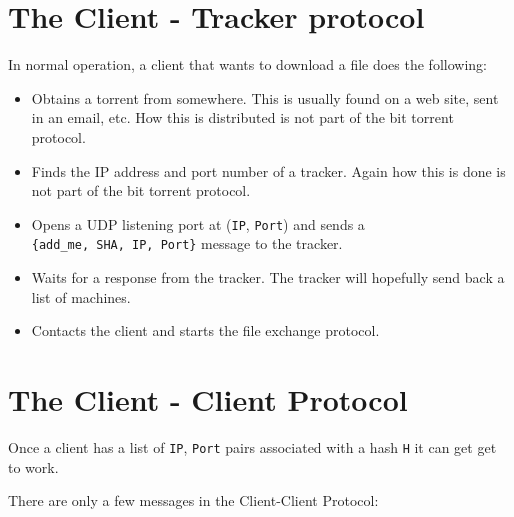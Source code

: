 \documentclass[10pt]{article}
\begin{document}
\section{The Client - Tracker protocol}

In normal operation, a client that wants to download a file does the
following:

\begin{itemize}
\item Obtains a torrent from somewhere. This is usually
  found on a web site, sent in an email, etc. How this 
is distributed is not part of the bit torrent protocol.

\item Finds the IP address and port number of a tracker.
  Again how this is done is not part of the bit torrent protocol.

\item Opens a UDP listening port at (\verb+IP+, \verb+Port+) and sends a\\
  \verb+{add_me, SHA, IP, Port}+ message to the tracker.

\item Waits for a response from the tracker. The tracker will hopefully
send back a list of machines.

\item Contacts the client and starts the file exchange protocol.
\end{itemize}

\section{The Client - Client Protocol}

Once a client has a list of \verb+IP+, \verb+Port+ pairs associated with a
hash \verb+H+ it can get get to work.

There are only a few messages in the Client-Client Protocol:
\end{document}
